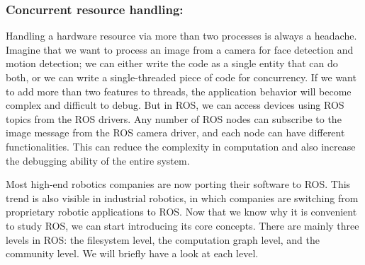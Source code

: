 \documentclass[../../main]{subfiles}
\begin{document}
\subsubsection{Concurrent resource handling:} Handling a hardware resource via more than two
processes is always a headache. Imagine that we want to process an image from a
camera for face detection and motion detection; we can either write the code as a
single entity that can do both, or we can write a single-threaded piece of code for
concurrency. If we want to add more than two features to threads, the application
behavior will become complex and difficult to debug. But in ROS, we can access
devices using ROS topics from the ROS drivers. Any number of ROS nodes can
subscribe to the image message from the ROS camera driver, and each node can
have different functionalities. This can reduce the complexity in computation and
also increase the debugging ability of the entire system.


Most high-end robotics companies are now porting their software to ROS.
This trend is also visible in industrial robotics, in which companies are switching from
proprietary robotic applications to ROS.
Now that we know why it is convenient to study ROS, we can start introducing its core
concepts. There are mainly three levels in ROS: the filesystem level, the computation graph
level, and the community level. We will briefly have a look at each level.
\newpage
\end{document}
